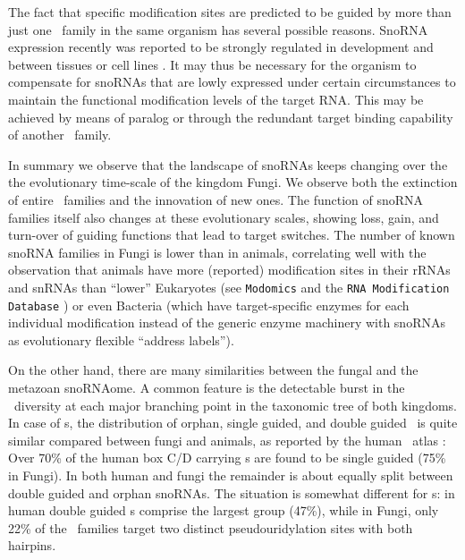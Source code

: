 The fact that specific modification sites are predicted to be guided
by more than just one \sno\ family in the same organism has several
possible reasons. SnoRNA expression recently was reported to be
strongly regulated in development and between tissues or cell lines
\cite{Kapushesky:2012, Jorjani:2016}. It may thus be necessary for the
organism to compensate for snoRNAs that are lowly expressed under
certain circumstances to maintain the functional modification levels
of the target RNA. This may be achieved by means of paralog or through
the redundant target binding capability of another \sno\ family.

In summary we observe that the landscape of snoRNAs keeps changing
over the the evolutionary time-scale of the kingdom Fungi. We observe
both the extinction of entire \sno\ families and the innovation of new
ones. The function of snoRNA families itself also changes at these
evolutionary scales, showing loss, gain, and turn-over of guiding
functions that lead to target switches. The number of known snoRNA
families in Fungi is lower than in animals, correlating well with the
observation that animals have more (reported) modification sites in
their rRNAs and snRNAs than ``lower'' Eukaryotes (see
\texttt{Modomics} and the \texttt{RNA Modification Database}
\cite{Machnicka:2013, Cantara:2011}) or even Bacteria (which have
target-specific enzymes for each individual modification instead of
the generic enzyme machinery with snoRNAs as evolutionary flexible
``address labels'').

On the other hand, there are many similarities between the fungal and
the metazoan snoRNAome.  A common feature is the detectable burst in
the \sno\ diversity at each major branching point in the taxonomic
tree of both kingdoms.  In case of \cd s, the distribution of orphan,
single guided, and double guided \snos\ is quite similar compared
between fungi and animals, as reported by the human \sno\ atlas
\citep{Jorjani:2016}: Over 70\% of the human box C/D carrying \sno s
are found to be single guided (75\% in Fungi).  In both human and
fungi the remainder is about equally split between double guided and
orphan snoRNAs. The situation is somewhat different for \haca s: in
human double guided \sno s comprise the largest group (47\%), while in
Fungi, only 22\% of the \haca\ families target two distinct
pseudouridylation sites with both hairpins.


